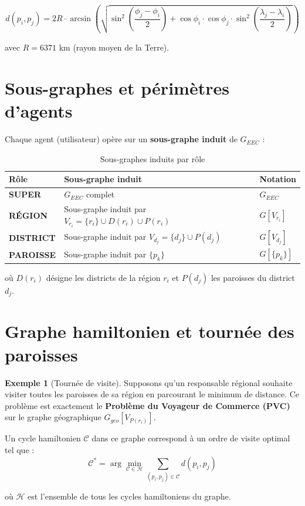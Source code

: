 \documentclass[12pt, a4paper]{report}
\theoremstyle{definition}
\newtheorem{exemple}{Exemple}[chapter]
\begin{document}
$$d(p_i, p_j) = 2R \cdot \arcsin\left(\sqrt{\sin^2\!\left(\frac{\phi_j - \phi_i}{2}\right) + \cos\phi_i \cdot \cos\phi_j \cdot \sin^2\!\left(\frac{\lambda_j - \lambda_i}{2}\right)}\right)$$

avec $R = 6371$ km (rayon moyen de la Terre).

\section{Sous-graphes et périmètres d'agents}

Chaque agent (utilisateur) opère sur un \textbf{sous-graphe induit} de $G_{EEC}$ :

\begin{table}[H]
\centering
\caption{Sous-graphes induits par rôle}
\begin{tabularx}{\textwidth}{>{\bfseries}l X l}
\toprule
Rôle & Sous-graphe induit & Notation \\
\midrule
SUPER & $G_{EEC}$ complet & $G_{EEC}$ \\
RÉGION & Sous-graphe induit par $V_{r_i} = \{r_i\} \cup D(r_i) \cup P(r_i)$ & $G[V_{r_i}]$ \\
DISTRICT & Sous-graphe induit par $V_{d_j} = \{d_j\} \cup P(d_j)$ & $G[V_{d_j}]$ \\
PAROISSE & Sous-graphe induit par $\{p_k\}$ & $G[\{p_k\}]$ \\
\bottomrule
\end{tabularx}
\end{table}

où $D(r_i)$ désigne les districts de la région $r_i$ et $P(d_j)$ les paroisses du district $d_j$.

\section{Graphe hamiltonien et tournée des paroisses}

\begin{exemple}[Tournée de visite]
Supposons qu'un responsable régional souhaite visiter toutes les paroisses de sa région en parcourant le minimum de distance. Ce problème est exactement le \textbf{Problème du Voyageur de Commerce (PVC)} sur le graphe géographique $G_{geo}[V_{P(r_i)}]$.

Un cycle hamiltonien $\mathcal{C}$ dans ce graphe correspond à un ordre de visite optimal tel que :
$$\mathcal{C}^* = \arg\min_{\mathcal{C} \in \mathcal{H}} \sum_{(p_i, p_j) \in \mathcal{C}} d(p_i, p_j)$$

où $\mathcal{H}$ est l'ensemble de tous les cycles hamiltoniens du graphe.
\end{exemple}
\end{document}
